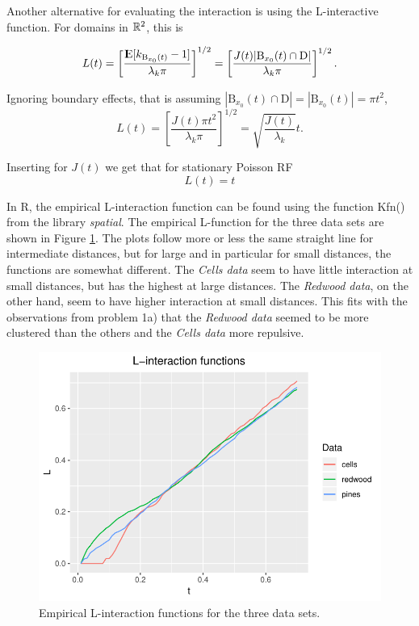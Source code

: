 Another alternative for evaluating the interaction is using the L-interactive function. For domains in $\mathbb{R}^2$, this is

\begin{equation}
    L(t) = \left[\frac{{\rm I\kern-.3em E}{[k_{\textrm{B}_{x_0}(t)}-1]}}{\lambda_k \pi}\right]^{1/2} = \left[\frac{J(t)|\textrm{B}_{x_0}(t) \cap \textrm{D}|}{\lambda_k \pi}\right]^{1/2}.
\end{equation}

Ignoring boundary effects, that is assuming $|\textrm{B}_{x_0}(t) \cap \textrm{D}| = |\textrm{B}_{x_0}(t)| = \pi t^2$, 
\begin{equation}
    L(t) = \left[\frac{J(t)\pi t^2}{\lambda_k \pi}\right]^{1/2} = \sqrt{\frac{J(t)}{\lambda_k}}t .
\end{equation}

Inserting for $J(t)$ we get that for stationary Poisson RF
\begin{equation}
    L(t) = t
\end{equation}

In R, the empirical L-interaction function can be found using the function Kfn() from the library \textit{spatial}. The empirical L-function for the three data sets are shown in Figure \ref{fig:L_emp}. The plots follow more or less the same straight line for intermediate distances, but for large and in particular for small distances, the functions are somewhat different. The \textit{Cells data} seem to have little interaction at small distances, but has the highest at large distances. The \textit{Redwood data}, on the other hand, seem to have higher interaction at small distances. This fits with the observations from problem 1a) that the \textit{Redwood data} seemed to be more clustered than the others and the \textit{Cells data} more repulsive. 

\begin{figure}
    \centering
    \includegraphics[scale=0.95]{figures/prob1_L_empirical.pdf}
    \caption{Empirical L-interaction functions for the three data sets.}
    \label{fig:L_emp}
\end{figure}

